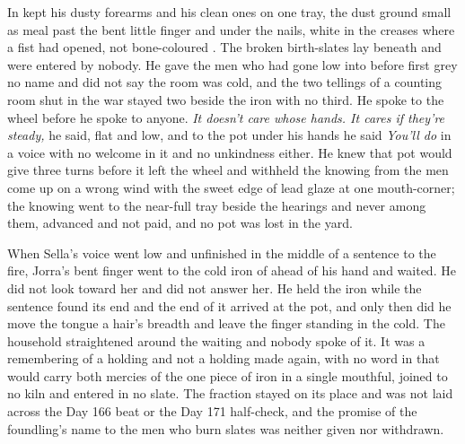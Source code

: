 \scenebreak

In   kept his dusty forearms and his clean ones on one tray, the dust ground small as meal past the bent little finger and under the nails, white in the creases where a fist had opened, not bone-coloured . The broken birth-slates lay beneath  and were entered by nobody. He gave the men who had gone low into  before first grey no name and did not say the room was cold, and the two tellings of a counting room shut in the war stayed two beside the iron with no third. He spoke to the wheel before he spoke to anyone. \emph{It doesn't care whose hands. It cares if they're steady,} he said, flat and low, and to the pot under his hands he said \emph{You'll do} in a voice with no welcome in it and no unkindness either. He knew  that pot would give three turns before it left the wheel and withheld the knowing from the men come up on a wrong wind with the sweet edge of lead glaze at one mouth-corner; the knowing went to the near-full tray beside the hearings and never among them, advanced and not paid, and no pot was lost in the yard.

When Sella's voice went low and unfinished in the middle of a sentence to the fire, Jorra's bent finger went to the cold iron of  ahead of his hand and waited. He did not look toward her and did not answer her. He held the iron while the sentence found its end and the end of it arrived at the pot, and only then did he move the tongue a hair's breadth and leave the finger standing in the cold. The household straightened around the waiting and nobody spoke of it. It was a remembering of a holding and not a holding made again, with no word in  that would carry both mercies of the one piece of iron in a single mouthful, joined to no kiln and entered in no slate. The fraction stayed on its place and was not laid across the Day 166 beat or the Day 171 half-check, and the promise of the foundling's name to the men who burn slates was neither given nor withdrawn.

